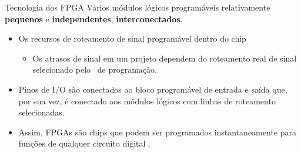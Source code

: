    
   \begin{frame}{Tecnologia dos FPGA} \vspace{-1em}
      Vários módulos lógicos programáveis relativamente \textbf{pequenos} e \textbf{independentes}, \textbf{interconectados}.
      
      \begin{itemize}
         \setlength{\itemsep}{1.2em}
         
         \item Os recursos de roteamento de sinal programável dentro do chip
         \begin{itemize}
            \item Os atrasos de sinal em um projeto dependem do roteamento real de sinal selecionado pelo \software\ de programação. 
         \end{itemize}
         
         \item Pinos de I/O são conectados ao bloco programável de entrada e saída que, por sua vez, é conectado aos módulos lógicos com linhas de roteamento selecionadas.
            \bigskip
         \item Assim, FPGAs são chips que podem ser programados instantaneamente para funções de qualquer circuito digital \cite{Choi2016}.   
      \end{itemize}
   \end{frame}

